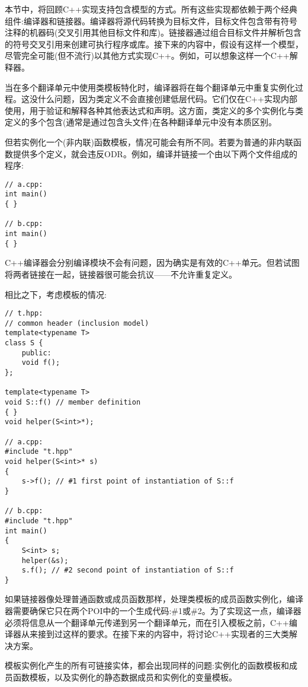 
本节中，将回顾C++实现支持包含模型的方式。所有这些实现都依赖于两个经典组件:编译器和链接器。编译器将源代码转换为目标文件，目标文件包含带有符号注释的机器码(交叉引用其他目标文件和库)。链接器通过组合目标文件并解析包含的符号交叉引用来创建可执行程序或库。接下来的内容中，假设有这样一个模型，尽管完全可能(但不流行)以其他方式实现C++。例如，可以想象这样一个C++解释器。

当在多个翻译单元中使用类模板特化时，编译器将在每个翻译单元中重复实例化过程。这没什么问题，因为类定义不会直接创建低层代码。它们仅在C++实现内部使用，用于验证和解释各种其他表达式和声明。这方面，类定义的多个实例化与类定义的多个包含(通常是通过包含头文件)在各种翻译单元中没有本质区别。

但若实例化一个(非内联)函数模板，情况可能会有所不同。若要为普通的非内联函数提供多个定义，就会违反ODR。例如，编译并链接一个由以下两个文件组成的程序:

\begin{lstlisting}[style=styleCXX]
// a.cpp:
int main()
{ }

// b.cpp:
int main()
{ }
\end{lstlisting}

C++编译器会分别编译模块不会有问题，因为确实是有效的C++单元。但若试图将两者链接在一起，链接器很可能会抗议——不允许重复定义。

相比之下，考虑模板的情况:

\begin{lstlisting}[style=styleCXX]
// t.hpp:
// common header (inclusion model)
template<typename T>
class S {
	public:
	void f();
};

template<typename T>
void S::f() // member definition
{ }
void helper(S<int>*);

// a.cpp:
#include "t.hpp"
void helper(S<int>* s)
{
	s->f(); // #1 first point of instantiation of S::f
}

// b.cpp:
#include "t.hpp"
int main()
{
	S<int> s;
	helper(&s);
	s.f(); // #2 second point of instantiation of S::f
}
\end{lstlisting}

如果链接器像处理普通函数或成员函数那样，处理类模板的成员函数实例化，编译器需要确保它只在两个POI中的一个生成代码:\#1或\#2。为了实现这一点，编译器必须将信息从一个翻译单元传递到另一个翻译单元，而在引入模板之前，C++编译器从来接到过这样的要求。在接下来的内容中，将讨论C++实现者的三大类解决方案。

模板实例化产生的所有可链接实体，都会出现同样的问题:实例化的函数模板和成员函数模板，以及实例化的静态数据成员和实例化的变量模板。

